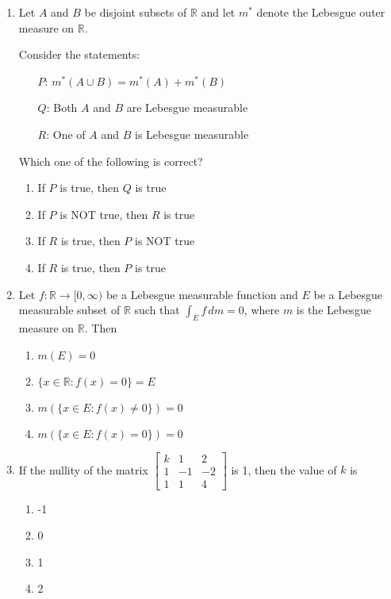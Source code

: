 \documentclass[journal]{IEEEtran}
\numberwithin{equation}{enumi}
\numberwithin{figure}{enumi}
\begin{document}
\begin{enumerate}
    \item Let $A$ and $B$ be disjoint subsets of $\mathbb{R}$ and let $m^*$ denote the Lebesgue outer measure on $\mathbb{R}$.

    Consider the statements:
    \begin{itemize}
        \item[$P$:] $m^*(A \cup B) = m^*(A) + m^*(B)$
        \item[$Q$:] Both $A$ and $B$ are Lebesgue measurable
        \item[$R$:] One of $A$ and $B$ is Lebesgue measurable
    \end{itemize}
    
    Which one of the following is correct?
    \begin{multicols}{2}
    \begin{enumerate}
        \item If $P$ is true, then $Q$ is true
        \item If $P$ is NOT true, then $R$ is true
        \item If $R$ is true, then $P$ is NOT true
        \item If $R$ is true, then $P$ is true
    \end{enumerate}
    \end{multicols}

    \item Let $f : \mathbb{R} \rightarrow [0, \infty)$ be a Lebesgue measurable function and $E$ be a Lebesgue measurable subset of $\mathbb{R}$ such that $\int_E f \, dm = 0$, where $m$ is the Lebesgue measure on $\mathbb{R}$. Then
    \begin{multicols}{2}
    \begin{enumerate}
        \item $m(E) = 0$
        \item $\{x \in \mathbb{R} : f(x) = 0\} = E$
        \item $m(\{x \in E : f(x) \neq 0\}) = 0$
        \item $m(\{x \in E : f(x) = 0\}) = 0$
    \end{enumerate}
    \end{multicols}

    \item If the nullity of the matrix 
    $\begin{bmatrix} k & 1 & 2 \\ 1 & -1 & -2 \\ 1 & 1 & 4 \end{bmatrix}$ is 1, then the value of $k$ is
    \begin{multicols}{4}
    \begin{enumerate}
        \item -1
        \item 0
        \item 1
        \item 2
    \end{enumerate}
    \end{multicols}


\end{enumerate}
\end{document}
